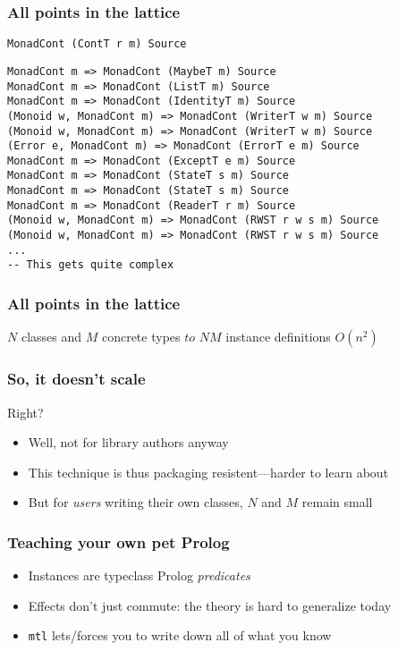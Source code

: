 \documentclass[pdf]{beamer}
\begin{document}
\begin{frame}[fragile]
  \frametitle{All points in the lattice}
\begin{lstlisting}
MonadCont (ContT r m) Source	 
\end{lstlisting}
  \pause
\begin{lstlisting}
MonadCont m => MonadCont (MaybeT m) Source	 
MonadCont m => MonadCont (ListT m) Source	 
MonadCont m => MonadCont (IdentityT m) Source	 
(Monoid w, MonadCont m) => MonadCont (WriterT w m) Source	 
(Monoid w, MonadCont m) => MonadCont (WriterT w m) Source	 
(Error e, MonadCont m) => MonadCont (ErrorT e m) Source	 
MonadCont m => MonadCont (ExceptT e m) Source	 
MonadCont m => MonadCont (StateT s m) Source	 
MonadCont m => MonadCont (StateT s m) Source	 
MonadCont m => MonadCont (ReaderT r m) Source	 
(Monoid w, MonadCont m) => MonadCont (RWST r w s m) Source	 
(Monoid w, MonadCont m) => MonadCont (RWST r w s m) Source
...
-- This gets quite complex
\end{lstlisting}
\end{frame}

\begin{frame}
  \frametitle{All points in the lattice}
  $N$ classes and $M$ concrete types $to$ $NM$ instance definitions
  \pause
  $O(n^2)$
\end{frame}

\begin{frame}
  \frametitle{So, it doesn't scale}
  Right?
  \pause
  \begin{itemize}
  \item Well, not for library authors anyway \pause
  \item This technique is thus packaging resistent---harder to learn about \pause
  \item But for \textit{users} writing their own classes, $N$ and $M$ remain small
  \end{itemize}
\end{frame}

\begin{frame}
  \frametitle{Teaching your own pet Prolog}
  \begin{itemize}
  \item Instances are typeclass Prolog \textit{predicates} \pause
  \item Effects don't just commute: the theory is hard to generalize today \pause
  \item \texttt{mtl} lets/forces you to write down all of what you know
  \end{itemize}
\end{frame}
\end{document}
